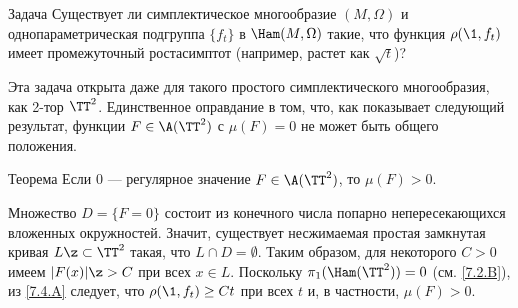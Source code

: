 \begin{thm}{Задача}\label{8.4.A}
Существует ли симплектическое многообразие $(M, \Omega)$ и однопараметрическая подгруппа $\{f_t\}$ в $\Ham (M, \Omega)$ такие, что функция $\rho (\1, f_t)$ имеет промежуточный ростасимптот (например, растет как $\sqrt{t}$)?
\end{thm}

Эта задача открыта даже для такого простого симплектического многообразия, как 2-тор $\TT^2$.
Единственное оправдание в том, что, как показывает следующий результат, функции $F \in \A (\TT^2)$ с $\mu (F) = 0$ не может быть общего положения.

\begin{thm}{Теорема}\label{8.4.B}
Если 0 --- регулярное значение $F \in \A (\TT^2)$, то $\mu (F)> 0$.
\end{thm}

Множество $D = \{F = 0\}$ состоит из конечного числа попарно непересекающихся вложенных окружностей.
Значит, существует несжимаемая простая замкнутая кривая $L \z\subset \TT^2$ такая, что $L\cap D = \emptyset$.
Таким образом, для некоторого $C> 0$ имеем $| F (x) | \z> C$ при всех $x \in L$.
Поскольку $\pi_1 (\Ham (\TT^2)) = 0$ (см. \ref{7.2.B}),  из \ref{7.4.A} следует, что $\rho (\1, f_t) \ge Ct$ при всех $t$ и, в частности, $\mu (F)> 0$.
\qeds
